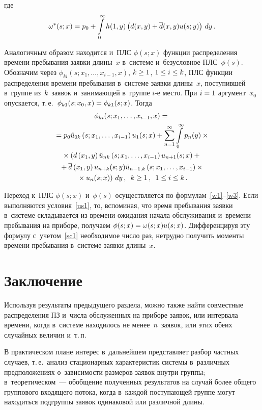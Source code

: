 \begin{multicols}{2}
\noindent где
$$
\omega^*(s;x)= p_0 + \int\limits_0^\infty
h(1,y) \left ( d(x,y) + \overline d(x,y) u(s;y)
\right ) \,dy\,.
$$

Аналогичным образом находится и~ПЛС $\phi(s;x)$ функции распределения
времени пребывания заявки длины~$x$ в~системе и~безусловное ПЛС~$\phi(s)$.
Обозначим через $\phi_{ki}(s;x_1, \dots, x_{i-1},x)$, $k \hm\ge 1$, $1\hm\le i \hm\le k$,
ПЛС функции распределения времени пребывания в~системе заявки длины~$x$,
поступившей в~группе из~$k$~заявок и~занимающей в~группе $i$-е место.
При $i\hm=1$ аргумент~$x_0$ опускается, т.\,е.\
 $\phi_{k1}(s;x_{0},x)\hm=\phi_{k1}(s;x)$.
Тогда
\begin{multline*}
\phi_{ki}(s;x_1, \dots, x_{i-1},x)
={}\\
{}=p_0 {\tilde u}_{0k}\left(s;x_1,\dots,x_{i-1}\right)u_{1}(s;x)
+ 
\sum\limits_{n=1}^\infty
\int\limits_0^\infty p_n(y)\times{}\\
{}\times \left(
d\left(x_1,y\right) {\tilde u}_{nk}\left(s;x_1,\dots,x_{i-1}\right)
u_{n+1}(s;x) +{}\right.
\\
{}+
\d\left(x_1,y\right) u_{n+k}(s;y) {\tilde u}_{n-1,k}\left(s;x_1,\dots,x_{i-1}\right)\times{}\\
\left.{}\times
u_{n}(s;x) %
\right)\,dy\,,  \enskip 
k \ge 1\,, \enskip 1 \le i \le k\,.
\end{multline*}

\noindent Переход к~ПЛС $\phi(s;x)$ и~$\phi(s)$ осуществляется
по формулам~\eqref{w1}--\eqref{w3}. Если выполняются условия~\eqref{us1}, то,
вспоминая, что время пребывания заявки в~системе складывается
из времени ожидания начала обслуживания и~времени пребывания на приборе,
получаем $\phi(s;x)\hm=\omega(s;x)u(s;x)$. Дифференцируя эту формулу 
с~учетом~\eqref{sc1} необходимое число раз, нетрудно получить моменты
времени пребывания  в~системе заявки  длины~$x$.


\section{Заключение}

\vspace*{-3pt}

Используя результаты предыдущего раздела,
можно также найти совместные распределения ПЗ 
и~числа обслуженных на приборе заявок, или интервала времени,
когда в~системе находилось не менее~$n$~заявок, 
или этих обеих случайных величин и~т.\,п.

В практическом плане интерес в~дальнейшем представляет разбор
 частных случаев, т.\,е.\ анализ
стационарных характеристик системы в~различных предположениях 
о~зависимости размеров заявок внутри группы; в~теоретическом~---
обобщение полученных результатов
на случай более общего группового входящего потока, когда
в~каждой поступающей группе могут находиться подгруппы заявок
одинаковой или различной длины.


\end{multicols}
